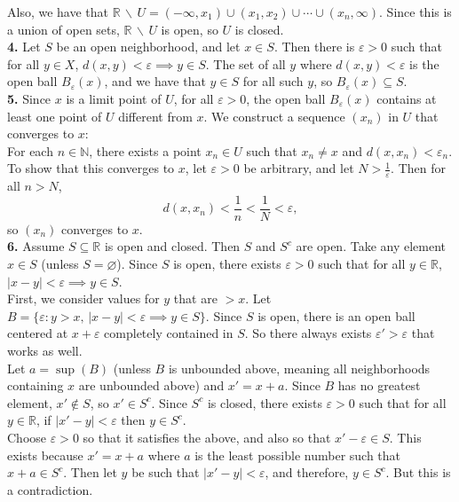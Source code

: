 \documentclass{article}
\newcommand{\R}{\mathbb{R}}
\newcommand{\N}{\mathbb{N}}
\newcommand{\eps}{\varepsilon}
\begin{document}
Also, we have that $\R\, \backslash\, U = (-\infty, x_1) \cup (x_1, x_2) \cup \cdots \cup (x_n, \infty)$. Since this is a union of open sets, $\R\, \backslash\, U$ is open, so $U$ is closed. \\

\textbf{4.} Let $S$ be an open neighborhood, and let $x \in S$. Then there is $\eps > 0$ such that for all $y \in X$, $d(x, y) < \eps \implies y \in S$. The set of all $y$ where $d(x, y) < \eps$ is the open ball $B_\eps(x)$, and we have that $y \in S$ for all such $y$, so $B_\eps(x) \subseteq S$. \\

\textbf{5.} Since $x$ is a limit point of $U$, for all $\eps > 0$, the open ball $B_\eps(x)$ contains at least one point of $U$ different from $x$. We construct a sequence $(x_n)$ in $U$ that converges to $x$: \\
For each $n \in \N$, there exists a point $x_n \in U$ such that $x_n \neq x$ and $d(x, x_n) < \eps_n$. \\

To show that this converges to $x$, let $\eps > 0$ be arbitrary, and let $N > \frac{1}{\eps}$. Then for all $n > N$,
$$d(x, x_n) < \frac{1}{n} < \frac{1}{N} < \eps,$$
so $(x_n)$ converges to $x$. \\

\textbf{6.} Assume $S \subseteq \R$ is open and closed. Then $S$ and $S^c$ are open. Take any element $x \in S$ (unless $S = \varnothing$). Since $S$ is open, there exists $\eps > 0$ such that for all $y \in \R$, $|x - y| < \eps \implies y \in S$. \\

First, we consider values for $y$ that are $> x$. Let $B = \{\eps: y > x,\, |x - y| < \eps \implies y \in S\}$. Since $S$ is open, there is an open ball centered at $x + \eps$ completely contained in $S$. So there always exists $\eps' > \eps$ that works as well. \\

Let $a = \sup(B)$ (unless $B$ is unbounded above, meaning all neighborhoods containing $x$ are unbounded above) and $x' = x + a$. Since $B$ has no greatest element, $x' \not \in S$, so $x' \in S^c$. Since $S^c$ is closed, there exists $\eps > 0$ such that for all $y \in \R$, if $|x' - y| < \eps$ then $y \in S^c$. \\

Choose $\eps > 0$ so that it satisfies the above, and also so that $x' - \eps \in S$. This exists because $x' = x + a$ where $a$ is the least possible number such that $x + a \in S^c$. Then let $y$ be such that $|x' - y| < \eps$, and therefore, $y \in S^c$. But this is a contradiction. \\
\end{document}
